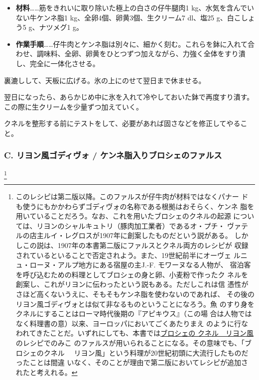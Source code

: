 \begin{recette}
\begin{itemize}
\item
  \textbf{材料}\ldots{}\ldots{}筋をきれいに取り除いた極上の白さの仔牛腿肉1
  kg、水気を含んでいない牛ケンネ脂1 kg、全卵4個、卵黄3個、生クリーム7
  dl、塩25 g、白こしょう5 g、ナツメグ1 g。
\item
  \textbf{作業手順}\ldots{}\ldots{}仔牛肉とケンネ脂は別々に、細かく刻む。これらを鉢に入れて合わせ、調味料、全卵、卵黄をひとつずつ加えながら、力強く全体をすり潰し、完全に一体化させる。
\end{itemize}

裏漉しして、天板に広げる。氷の上にのせて翌日まで休ませる。

翌日になったら、あらかじめ中に氷を入れて冷やしておいた鉢で再度すり潰す。この際に生クリームを少量ずつ加えていく。

クネルを整形する前にテストをして、必要があれば固さなどを修正してやること。

\maeaki

\hypertarget{godiveau-lyonnais}{%
\subsubsection{C. リヨン風ゴディヴォ /
ケンネ脂入りブロシェのファルス}\label{godiveau-lyonnais}}

\footnote{このレシピは第二版以降。このファルスが仔牛肉が材料ではなくパナー
  ドも使うにもかかわらずゴディヴォの名称である根拠はおそらく、ケンネ
  脂を用いていることだろう。なお、これを用いたブロシェのクネルの起源
  については、リヨンのシャルキュトリ（豚肉加工業者）であるオ・プチ・
  ヴァテルの店主ルイ・レグロスが1907年に創案したものだという説がある。
  しかしこの説は、1907年の本書第二版にファルスとクネル両方のレシピが
  収録されているといることで否定されよう。また、19世紀前半にオーヴェ
  ルニュ・ローヌ・アルプ地方にある宿屋の主J.-F. モワーヌなる人物が、
  宿泊客を呼び込むための料理としてブロシェの身と卵、小麦粉で作ったク
  ネルを創案し、これがリヨンに伝わったという説もある。ただしこれは信
  憑性がさほど高くないうえに、そもそもケンネ脂を使わないのであれば、
  その後のリヨン風ゴディヴォとは似て非なるものということになろう。魚
  のすり身をクネルにすることはローマ時代後期の『アピキウス』（この場
  合は人物ではなく料理書の意）以来、ヨーロッパにおいてごくあたりまえ
  のように行なわれてきたことだ。いずれにしても、本書では\protect\hyperlink{quenelles-de-brochet-lyonnaise}{ブロシェの
  クネル　リヨン風}のレシピでのみこ
  のファルスが用いられることになる。その意味でも、「ブロシェのクネル
  　リヨン風」という料理が20世紀初頭に大流行したものだったことは間違
  いなく、そのことが理由で第二版においてレシピが追加されたと考えれる。}


\end{recette}
